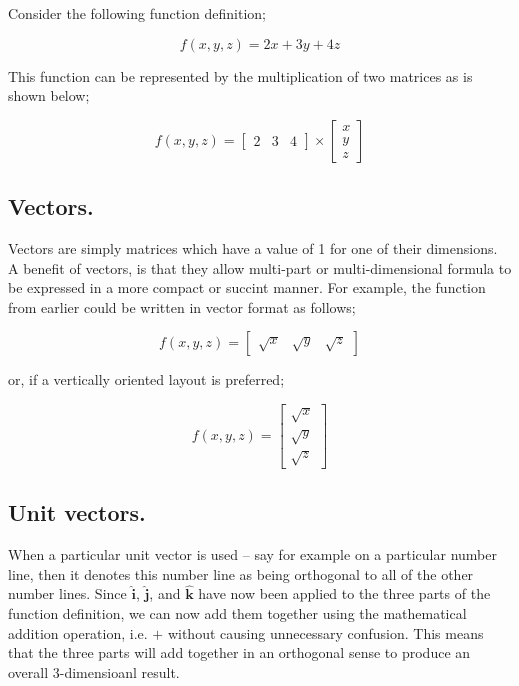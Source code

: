 \documentclass{article}
\begin{document}
Consider the following function definition;

\begin{equation*}
f(x,y,z) = 2x + 3y + 4z
\end{equation*}

This function can be represented by the multiplication of two matrices as is shown below;

\begin{equation*}
f(x,y,z)= 
\begin{bmatrix}
2 & 3 & 4
\end{bmatrix}
\times
\begin{bmatrix}
x \\
y \\
z
\end{bmatrix}
\end{equation*}

 
\subsection{Vectors.}

Vectors are simply matrices which have a value of 1 for one of their dimensions. A benefit of vectors, is that 
they allow multi-part or multi-dimensional formula to be expressed in a more compact or succint manner. For example,
the function from earlier could be written in vector format as follows;

\begin{equation*}
f(x,y,z) = 
\begin{bmatrix}
\sqrt{x} & \sqrt{y} & \sqrt{z}
\end{bmatrix}
\end{equation*}

or, if a vertically oriented layout is preferred;

\begin{equation*}
f(x,y,z) = 
\begin{bmatrix}
\sqrt{x} \\
\sqrt{y} \\
\sqrt{z}
\end{bmatrix}
\end{equation*}



\subsection{Unit vectors.}

When a particular unit vector is used -- say for example
on a particular number line, then it denotes this number line as being orthogonal to all of the other number lines.
Since $\hat{\mathrm{\bm{i}}}$, $\hat{\mathrm{\bm{j}}}$, and $\hat{\mathrm{\bm{k}}}$ have now been applied
to the three parts of the function definition, we can now add them together using the mathematical addition operation,
i.e. $+$ without causing unnecessary confusion. This means that the three parts will add together in an orthogonal
sense to produce an overall 3-dimensioanl result.\\
\end{document}
